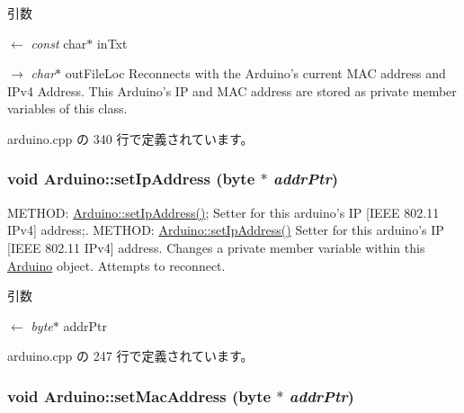 \begin{DoxyParams}{引数}
\item[\mbox{$\leftarrow$} {\em const}]char$\ast$ inTxt \item[\mbox{$\rightarrow$} {\em char$\ast$}]outFileLoc Reconnects with the Arduino's current MAC address and IPv4 Address. This Arduino's IP and MAC address are stored as private member variables of this class. \end{DoxyParams}


 arduino.cpp の 340 行で定義されています。\hypertarget{classArduino_a1c45a91da743dad62e50f8880ee6ec1f_a1c45a91da743dad62e50f8880ee6ec1f}{
\subsubsection[{setIpAddress}]{\setlength{\rightskip}{0pt plus 5cm}void Arduino::setIpAddress (byte $\ast$ {\em addrPtr})}}
\label{classArduino_a1c45a91da743dad62e50f8880ee6ec1f_a1c45a91da743dad62e50f8880ee6ec1f}


METHOD: \hyperlink{classArduino_a1c45a91da743dad62e50f8880ee6ec1f_a1c45a91da743dad62e50f8880ee6ec1f}{Arduino::setIpAddress()}; Setter for this arduino's IP \mbox{[}IEEE 802.11 IPv4\mbox{]} address;. METHOD: \hyperlink{classArduino_a1c45a91da743dad62e50f8880ee6ec1f_a1c45a91da743dad62e50f8880ee6ec1f}{Arduino::setIpAddress()} Setter for this arduino's IP \mbox{[}IEEE 802.11 IPv4\mbox{]} address. Changes a private member variable within this \hyperlink{classArduino}{Arduino} object. Attempts to reconnect.


\begin{DoxyParams}{引数}
\item[\mbox{$\leftarrow$} {\em byte$\ast$}]addrPtr \end{DoxyParams}


 arduino.cpp の 247 行で定義されています。\hypertarget{classArduino_ab4692c5d510b6b5583e703ecd32bf778_ab4692c5d510b6b5583e703ecd32bf778}{
\subsubsection[{setMacAddress}]{\setlength{\rightskip}{0pt plus 5cm}void Arduino::setMacAddress (byte $\ast$ {\em addrPtr})}}
\label{classArduino_ab4692c5d510b6b5583e703ecd32bf778_ab4692c5d510b6b5583e703ecd32bf778}



